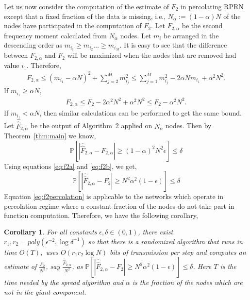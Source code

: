\documentclass[10pt,twosided,a4paper,draft,onecolumn]{article}
\newcommand{\prob}[1]{\mathbb{P}\left[ #1 \right]}
\newtheorem{corollary}{Corollary}
\begin{document}
Let us now consider the computation of the estimate of $F_2$ in
percolating RPRN except that a fixed fraction of the data is missing,
i.e., $N_{\alpha}:=(1-\alpha) N$ of the nodes have participated in the
computation of $F_2.$ Let $F_{2,\alpha}$ be the second frequency
moment calculated from $N_{\alpha}$ nodes.  Let $m_i$ be arranged in
the descending order as $m_{i_1} \geq m_{i_2}\ldots \geq m_{i_M}$.  It
is easy to see that the difference between $F_{2,\alpha}$ and $F_2$
will be maximized when the nodes that are removed had value
$i_1$. Therefore,
\begin{eqnarray*}
  F_{2,\alpha} \leq (m_{i_1} -\alpha N)^2 + \sum\limits_{j=2}^M
  m_{i_j}^2 \leq \sum\limits_{j=1}^M m_{i_j}^2 -2\alpha N m_{i_1}
  +\alpha^2 N^2.
\end{eqnarray*}
If $m_{i_1} \geq \alpha N, $
\begin{eqnarray}
  F_{2,\alpha}  \leq F_2 -2\alpha ^2 N^2 + \alpha^2 N^2 \leq F_2
  -\alpha ^2 N^2.  \label{eq:f2a} 
\end{eqnarray}
If $m_{i_1} < \alpha N$, then similar calculations can be performed to
get the same bound. Let $\hat{\hat{F}}_{2,\alpha}$ be the output of
Algorithm~2 applied on $N_{\alpha}$ nodes. Then by
Theorem~\ref{thm:main} we know,
\begin{equation}
  \prob{|\hat{\hat{F}}_{2,\alpha} - F_{2,\alpha}| \geq
    (1-\alpha)^2N^2\epsilon}  \leq  \delta \label{eq:f2b} 
\end{equation}  
Using equations \ref{eq:f2a} and \ref{eq:f2b}, we get,
\begin{equation}
  \prob{|\hat{\hat{F}}_{2,\alpha} - F_2| \geq N^2\alpha^2(1-\epsilon)}
  \leq \delta \label{eq:f2percolation} 
\end{equation}
Equation \ref{eq:f2percolation} is applicable to the networks which
operate in percolation regime where a constant fraction of the nodes
do not take part in function computation. Therefore, we have the
following corollary,
\begin{corollary}
  \label{corollary:percolation}
  For all constants $\epsilon,\delta \in (0,1)$, there exist $r_1,r_2
  = poly(\epsilon^{-2}, \log \delta^{-1})$ so that there is a randomized algorithm that runs in time $O(T),$ uses $O(r_1r_2 \log N)$ bits of transmission per step and computes an estimate of
  $\frac{F_2}{N^2}$, say $\frac{\hat{\hat{F}}_{2,\alpha}}{N^2}$, as 
  $\prob{ |\hat{\hat{F}}_{2,\alpha} - F_2| \geq
    N^2\alpha^2(1-\epsilon)} \leq \delta$. Here $T$ is the time
  needed by the spread algorithm and $\alpha$ is the fraction of the
  nodes which are not in the giant
  component.
\end{corollary}
\end{document}
